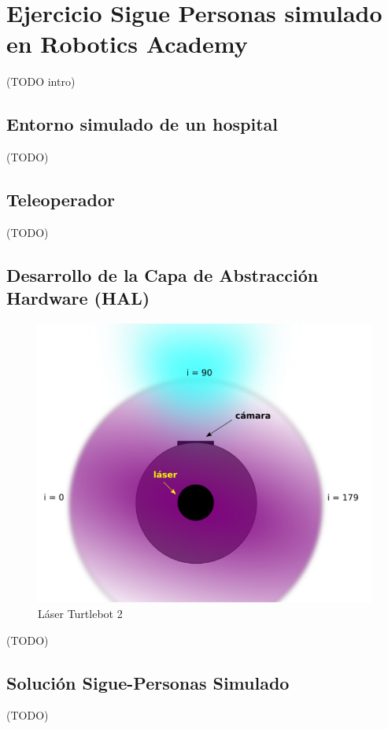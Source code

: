 \chapter{Ejercicio Sigue Personas simulado en Robotics Academy}
\label{cap:capitulo5}

(TODO intro)

\section{Entorno simulado de un hospital}
\label{sec:hospital_gazebo}

(TODO)

\section{Teleoperador}
\label{sec:teleoperador}

(TODO)

\section{Desarrollo de la Capa de Abstracción Hardware (HAL)}
\label{sec:turtlebot2_hal_simulado}

\begin{figure} [H]
  \begin{center}
    \includegraphics[width=15cm]{imagenes/vista-planta-turtlebot2.png}
  \end{center}
  \caption[Láser Turtlebot 2]{Láser Turtlebot 2}
  \label{fig:vista_planta_turtlebot2}
\end{figure}
(TODO)

\section{Solución Sigue-Personas Simulado}
\label{sec:sigue_personas_simulado}

(TODO)